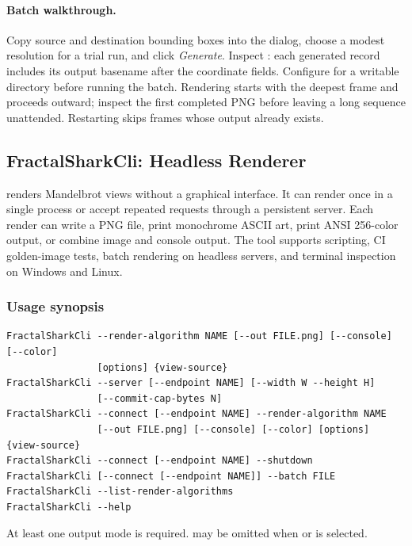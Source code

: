 \paragraph{Batch walkthrough.}
Copy source and destination bounding boxes into the dialog, choose a modest
resolution for a trial run, and click \emph{Generate}. Inspect
: each generated record includes its output basename
after the coordinate fields. Configure  for a writable
directory before running the batch. Rendering starts with the deepest frame
and proceeds outward; inspect the first completed PNG before leaving a long
sequence unattended. Restarting skips frames whose output already exists.

\subsection{FractalSharkCli: Headless Renderer}
\label{sec:fractalshark-cli}

 renders Mandelbrot views without a graphical interface.
It can render once in a single process or accept repeated requests through a
persistent server. Each render can write a PNG file, print monochrome ASCII
art, print ANSI 256-color output, or combine image and console output. The
tool supports scripting, CI golden-image tests, batch rendering on headless
servers, and terminal inspection on Windows and Linux.

\subsubsection*{Usage synopsis}

\begin{lstlisting}
FractalSharkCli --render-algorithm NAME [--out FILE.png] [--console] [--color]
                [options] {view-source}
FractalSharkCli --server [--endpoint NAME] [--width W --height H]
                [--commit-cap-bytes N]
FractalSharkCli --connect [--endpoint NAME] --render-algorithm NAME
                [--out FILE.png] [--console] [--color] [options] {view-source}
FractalSharkCli --connect [--endpoint NAME] --shutdown
FractalSharkCli [--connect [--endpoint NAME]] --batch FILE
FractalSharkCli --list-render-algorithms
FractalSharkCli --help
\end{lstlisting}

At least one output mode is required.  may be omitted when
 or  is selected.

